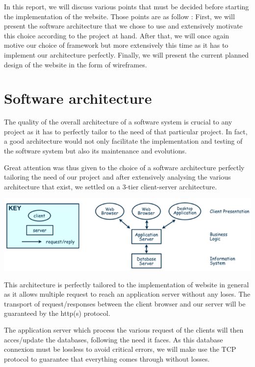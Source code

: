 
In this report, we will discuss various points that must be decided before starting the implementation of the website. Those points are as follow : First, we will present the software architecture that we chose to use and extensively motivate this choice according to the project at hand. After that, we will once again motive our choice of framework but more extensively this time as it has to implement our architecture perfectly. Finally, we will present the current planned design of the website in the form of wireframes.

\section{Software architecture}

The quality of the overall architecture of a software system is crucial to any project as it has to perfectly tailor to the need of that particular project. In fact, a good architecture would not only facilitate the implementation and testing of the software system but also its maintenance and evolutions.\newline

Great attention was thus given to the choice of a software architecture perfectly tailoring the need of our project and after extensively analysing the various architecture that exist, we settled on a 3-tier client-server architecture. \newline

\includegraphics[width=0.9\linewidth]{ClientServerArchitecture.png}

This architecture is perfectly tailored to the implementation of website in general as it allows multiple request to reach an application server without any loses. The transport of request/responses between the client browser and our server will be guaranteed by the http(s) protocol. \newline

The application server which process the various request of the clients will then acces/update the databases, following the need it faces. As this database connexion must be lossless to avoid critical errors, we will make use the TCP protocol to guarantee that everything comes through without losses. \newline

